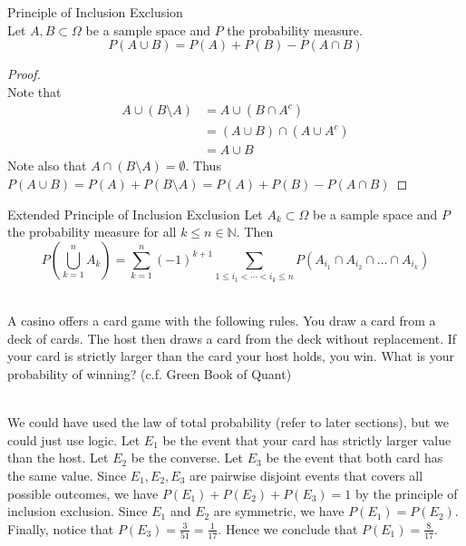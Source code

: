 \documentclass[a4paper]{article}
\begin{document}
\begin{thm}{Principle of Inclusion Exclusion}{}\\
Let $A,B\subset\Omega$ be a sample space and $P$ the probability measure. $$P(A\cup B)=P(A)+P(B)-P(A\cap B)$$
\begin{proof}\\
Note that 
\begin{align*}
A\cup(B\setminus A)&=A\cup(B\cap A^c)\\
&=(A\cup B)\cap(A\cup A^c)\\
&=A\cup B
\end{align*} Note also that $A\cap (B\setminus A)=\emptyset$. Thus $P(A\cup B)=P(A)+P(B\setminus A)=P(A)+P(B)-P(A\cap B)$
\end{proof}
\end{thm}

\begin{thm}{Extended Principle of Inclusion Exclusion}{} Let $A_k\subset\Omega$ be a sample space and $P$ the probability measure for all $k\leq n\in\mathbb{N}$. Then $$P\left(\bigcup_{k=1}^n A_k\right)=\sum_{k=1}^n(-1)^{k+1}\sum_{1\leq i_1<\cdots<i_k\leq n}P(A_{i_1}\cap A_{i_2}\cap\dots\cap A_{i_k})$$
\end{thm}

\begin{eg}{}{}\\
A casino offers a card game with the following rules. You draw a card from a deck of cards. The host then draws a card from the deck without replacement. If your card is strictly larger than the card your host holds, you win. What is your probability of winning? (c.f. Green Book of Quant)
\begin{answer}\\
We could have used the law of total probability (refer to later sections), but we could just use logic. Let $E_1$ be the event that your card has strictly larger value than the host. Let $E_2$ be the converse. Let $E_3$ be the event that both card has the same value. Since $E_1,E_2,E_3$ are pairwise disjoint events that covers all possible outcomes, we have $P(E_1)+P(E_2)+P(E_3)=1$ by the principle of inclusion exclusion. Since $E_1$ and $E_2$ are symmetric, we have $P(E_1)=P(E_2)$. Finally, notice that $P(E_3)=\frac{3}{51}=\frac{1}{17}$. Hence we conclude that $P(E_1)=\frac{8}{17}$. 
\end{answer}
\end{eg}
\end{document}
